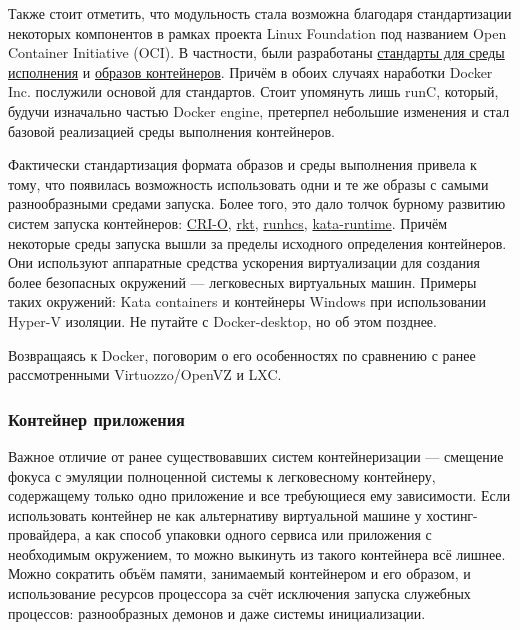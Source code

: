 \documentclass[14pt, a4paper]{article}
\begin{document}
Также стоит отметить, что модульность стала возможна благодаря стандартизации некоторых
компонентов в рамках проекта Linux Foundation под названием Open Container Initiative (OCI). В
частности, были разработаны \href{}{стандарты для среды исполнения} и \href{https://github.com/opencontainers/runtime-spec}{образов контейнеров}. Причём в
обоих случаях наработки Docker Inc. послужили основой для стандартов. Стоит упомянуть лишь runC,
который, будучи изначально частью Docker engine, претерпел небольшие изменения и стал базовой
реализацией среды выполнения контейнеров.

Фактически стандартизация формата образов и среды выполнения привела к тому, что появилась
возможность использовать одни и те же образы с самыми разнообразными средами запуска. Более
того, это дало толчок бурному развитию систем запуска контейнеров: \href{https://github.com/cri-o/cri-o}{CRI-O}, 
\href{https://github.com/rkt/rkt}{rkt}, \href{https://docs.microsoft.com/en-us/virtualization/windowscontainers/deploy-containers/containerd}{runhcs}, \href{https://github.com/kata-containers/runtime}{kata-runtime}.
Причём некоторые среды запуска вышли за пределы исходного определения контейнеров. Они
используют аппаратные средства ускорения виртуализации для создания более безопасных
окружений — легковесных виртуальных машин. Примеры таких окружений: Kata containers и
контейнеры Windows при использовании Hyper-V изоляции. Не путайте с Docker-desktop, но об этом
позднее.

Возвращаясь к Docker, поговорим о его особенностях по сравнению с ранее рассмотренными
Virtuozzo/OpenVZ и LXC.\\

\subsubsection*{Контейнер приложения}

Важное отличие от ранее существовавших систем контейнеризации — смещение фокуса с эмуляции
полноценной системы к легковесному контейнеру, содержащему только одно приложение и все
требующиеся ему зависимости. Если использовать контейнер не как альтернативу виртуальной
машине у хостинг-провайдера, а как способ упаковки одного сервиса или приложения с необходимым
окружением, то можно выкинуть из такого контейнера всё лишнее. Можно сократить объём памяти,
занимаемый контейнером и его образом, и использование ресурсов процессора за счёт исключения
запуска служебных процессов: разнообразных демонов и даже системы инициализации.
\end{document}
